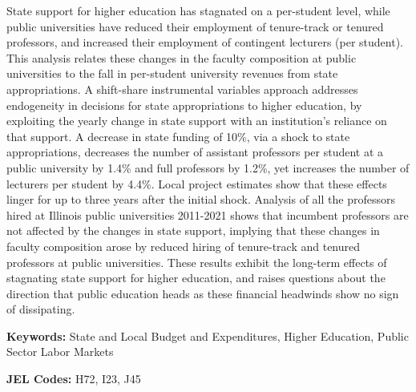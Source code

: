 \noindent
State support for higher education has stagnated on a per-student level, while public universities have reduced their employment of tenure-track or tenured professors, and increased their employment of contingent lecturers (per student).
This analysis relates these changes in the faculty composition at public universities to the fall in per-student university revenues from state appropriations.
A shift-share instrumental variables approach addresses endogeneity in decisions for state appropriations to higher education, by exploiting the yearly change in state support with an institution's reliance on that support.
A decrease in state funding of 10\%, via a shock to state appropriations, decreases the number of assistant professors per student at a public university by 1.4\% and full professors by 1.2\%, yet increases the number of lecturers per student by 4.4\%.
Local project estimates show that these effects linger for up to three years after the initial shock.
Analysis of all the professors hired at Illinois public universities 2011-2021 shows that incumbent professors are not affected by the changes in state support, implying that these changes in faculty composition arose by reduced hiring of tenure-track and tenured professors at public universities.
These results exhibit the long-term effects of stagnating state support for higher education, and raises questions about the direction that public education heads as these financial headwinds show no sign of dissipating.

\vspace{0.75cm}
\noindent\textbf{Keywords:}
State and Local Budget and Expenditures,
Higher Education,
Public Sector Labor Markets

\vspace{0.5cm}
\noindent\textbf{JEL Codes:} H72, I23, J45